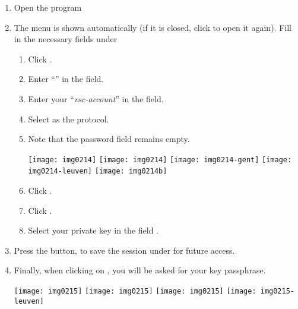   \begin{enumerate}
  \item  Open the program
  \item The  menu is shown automatically (if it is closed, click  to open it again).  Fill in the necessary fields under
  \begin{enumerate}
  \item  Click .
  \item  Enter ``\emph{\loginnode}'' in the  field.
  \item  Enter your ``\emph{vsc-account}'' in the  field.
  \item  Select  as the  protocol.
  \item  Note that the password field remains empty.
  \begin{center}
\ifantwerpen
  \texttt{[image: img0214]}
\fi
\ifbrussel
  \texttt{[image: img0214]}
\fi
\ifgent
  \texttt{[image: img0214-gent]}
\fi
\ifleuven
  \texttt{[image: img0214-leuven]}
\fi
  \texttt{[image: img0214b]}
  \end{center}

  \item  Click .
  \item  Click .
  \item  Select your private key in the field .
  \end{enumerate}

  \item Press the  button, to save the session under
   for future access.
  \item  Finally, when clicking on , you will be asked for your key passphrase.

  \begin{center}
\ifantwerpen
  \texttt{[image: img0215]}
\fi
\ifbrussel
  \texttt{[image: img0215]}
\fi
\ifgent
  \texttt{[image: img0215]}
\fi
\ifleuven
  \texttt{[image: img0215-leuven]}
\fi
  \end{center}

  \end{enumerate}

